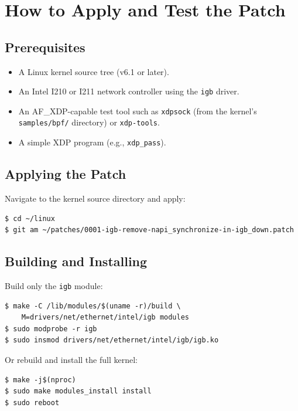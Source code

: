 \documentclass[11pt,a4paper,openany]{book}
\begin{document}
\chapter{How to Apply and Test the Patch}
\label{app:apply-test}

\section{Prerequisites}

\begin{itemize}
\item A Linux kernel source tree (v6.1 or later).
\item An Intel I210 or I211 network controller using the \texttt{igb}
    driver.
\item An AF\_XDP-capable test tool such as \texttt{xdpsock}
    (from the kernel's \texttt{samples/bpf/} directory) or
    \texttt{xdp-tools}.
\item A simple XDP program (e.g., \texttt{xdp\_pass}).
\end{itemize}

\section{Applying the Patch}

Navigate to the kernel source directory and apply:

\begin{lstlisting}[style=shellstyle]
$ cd ~/linux
$ git am ~/patches/0001-igb-remove-napi_synchronize-in-igb_down.patch
\end{lstlisting}

\section{Building and Installing}

Build only the \texttt{igb} module:

\begin{lstlisting}[style=shellstyle]
$ make -C /lib/modules/$(uname -r)/build \
    M=drivers/net/ethernet/intel/igb modules
$ sudo modprobe -r igb
$ sudo insmod drivers/net/ethernet/intel/igb/igb.ko
\end{lstlisting}

Or rebuild and install the full kernel:

\begin{lstlisting}[style=shellstyle]
$ make -j$(nproc)
$ sudo make modules_install install
$ sudo reboot
\end{lstlisting}
\end{document}
